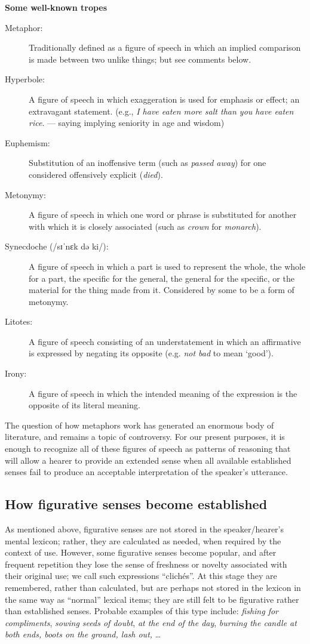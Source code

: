 \ea \label{ex:5.18}
\textbf{Some well-known tropes}\\
\begin{description}
\item[Metaphor:] Traditionally defined as a figure of speech in which an implied comparison is made between two unlike things; but see comments below.
\item[Hyperbole:] A figure of speech in which exaggeration is used for emphasis or effect; an extravagant statement. (e.g., \textit{I have eaten more salt than you have eaten rice}. —  saying implying seniority in age and wisdom)
\item[Euphemism:] Substitution of an inoffensive term (such as \textit{passed away}) for one considered offensively explicit (\textit{died}).
\item[Metonymy:] A figure of speech in which one word or phrase is substituted for another with which it is closely associated (such as \textit{crown} for \textit{monarch}).
\item[Synecdoche (/sɪˈnɛk də ki/):] A figure of speech in which a part is used to represent the whole, the whole for a part, the specific for the general, the general for the specific, or the material for the thing made from it. Considered by some to be a form of metonymy.
\item[Litotes:] A figure of speech consisting of an understatement in which an affirmative is expressed by negating its opposite (e.g. \textit{not bad} to mean ‘good’).
\item[Irony:] A figure of speech in which the intended meaning of the expression is the opposite of its literal meaning.
\end{description}
\z


The question of how metaphors work has generated an enormous body of literature, and remains a topic of controversy. For our present purposes, it is enough to recognize all of these figures of speech as patterns of reasoning that will allow a hearer to provide an extended sense when all available established senses fail to produce an acceptable interpretation of the speaker’s utterance.


\subsection{How figurative senses become established}\label{sec:5.4.2}

As mentioned above, figurative senses are not stored in the speaker/hearer’s mental lexicon; rather, they are calculated as needed, when required by the context of use. However, some figurative senses become popular, and after frequent repetition they lose the sense of freshness or novelty associated with their original use; we call such expressions “clichés”. At this stage they are remembered, rather than calculated, but are perhaps not stored in the lexicon in the same way as “normal” lexical items; they are still felt to be figurative rather than established senses. Probable examples of this type include: \textit{fishing for compliments}, \textit{sowing seeds of doubt}, \textit{at the end of the day}, \textit{burning the candle at both ends, boots on the ground, lash out,} …


